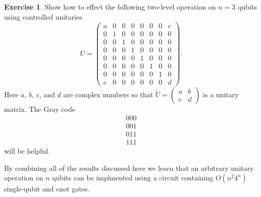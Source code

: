 \documentclass[12pt,oneside]{amsart}
\theoremstyle{plain}%
\theoremstyle{definition}
\newtheorem{exercise}{\color{cgblue}Exercise}[section]
\theoremstyle{remark}
\begin{document}
\begin{exercise}
  Show how to effect the following two-level operation on $n=3$ qubits using controlled unitaries.
  \begin{equation}
    U = \begin{pmatrix}
      a & 0 & 0 & 0 & 0 & 0 & 0 & c \\
      0 & 1 & 0 & 0 & 0 & 0 & 0 & 0 \\
      0 & 0 & 1 & 0 & 0 & 0 & 0 & 0 \\
      0 & 0 & 0 & 1 & 0 & 0 & 0 & 0 \\
      0 & 0 & 0 & 0 & 1 & 0 & 0 & 0 \\
      0 & 0 & 0 & 0 & 0 & 1 & 0 & 0 \\
      0 & 0 & 0 & 0 & 0 & 0 & 1 & 0 \\
      c & 0 & 0 & 0 & 0 & 0 & 0 & d 
    \end{pmatrix}.
  \end{equation}
  Here $a$, $b$, $c$, and $d$ are complex numbers so that $\widetilde{U}=\left(\begin{smallmatrix} a & b\\ c & d \end{smallmatrix}\right)$ is a unitary matrix. The Gray code 
  \begin{equation}
  \begin{matrix}
    000 \\
    001 \\
    011 \\
    111
  \end{matrix}
\end{equation}
will be helpful.
\end{exercise} 

By combining all of the results discussed here we learn that an arbitrary unitary operation on $n$ qubits can be implmented using a circuit containing $O(n^2 4^n)$ single-qubit and {\sc cnot} gates. 
\end{document}
